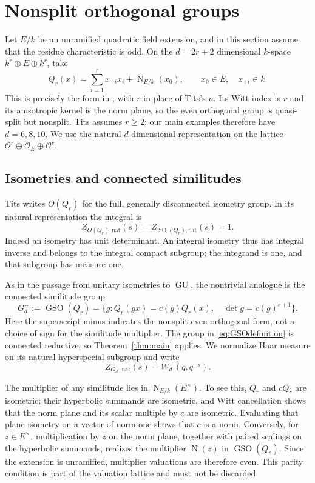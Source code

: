 \documentclass[11pt,a4paper]{article}
\theoremstyle{definition}
\newcommand{\OO}{\mathcal O}
\newcommand{\GU}{\operatorname{GU}}
\newcommand{\GSO}{\operatorname{GSO}}
\newcommand{\SO}{\operatorname{SO}}
\newcommand{\N}{\operatorname N}
\begin{document}
\section{Nonsplit orthogonal groups}
\label{sec:orthogonal}
Let $E/k$ be an unramified quadratic field extension, and in this
section assume that the residue characteristic is odd. On the
$d=2r+2$ dimensional $k$-space $k^r\oplus E\oplus k^r$, take
\begin{equation}\label{eq:orthogonalform}
 Q_r(x)=\sum_{i=1}^r x_{-i}x_i+\N_{E/k}(x_0),
 \qquad x_0\in E,\quad x_{\pm i}\in k.
\end{equation}
This is precisely the form in \cite[Example~1.16, pp.~42--43]{Tits},
with $r$ in place of Tits's $n$. Its Witt index is $r$ and its
anisotropic kernel is the norm plane, so the even orthogonal group
is quasi-split but nonsplit. Tits assumes $r\geq2$; our main
examples therefore have $d=6,8,10$. We use the natural
$d$-dimensional representation on the lattice
$\OO^r\oplus\OO_E\oplus\OO^r$.

\subsection{Isometries and connected similitudes}
Tits writes $O(Q_r)$ for the full, generally disconnected isometry
group. In its natural representation the integral is
\begin{equation}\label{eq:orthogonalisometry}
 Z_{O(Q_r),\mathrm{nat}}(s)=Z_{\SO(Q_r),\mathrm{nat}}(s)=1.
\end{equation}
Indeed an isometry has unit determinant. An integral isometry thus
has integral inverse and belongs to the integral compact subgroup;
the integrand is one, and that subgroup has measure one.

As in the passage from unitary isometries to $\GU$, the nontrivial
analogue is the connected similitude group
\begin{equation}\label{eq:GSOdefinition}
 G_d^-:=\GSO(Q_r)=
 \{g:Q_r(gx)=c(g)Q_r(x),\quad\det g=c(g)^{r+1}\}.
\end{equation}
Here the superscript minus indicates the nonsplit even orthogonal
form, not a choice of sign for the similitude multiplier. The group
in \eqref{eq:GSOdefinition} is connected reductive, so
Theorem~\ref{thm:main} applies. We normalize Haar measure on its
natural hyperspecial subgroup and write
\[
 Z_{G_d^-,\mathrm{nat}}(s)=W_d^-(q,q^{-s}).
\]

The multiplier of any similitude lies in $\N_{E/k}(E^\times)$.
To see this, $Q_r$ and $cQ_r$ are isometric; their hyperbolic
summands are isometric, and Witt cancellation shows that the norm
plane and its scalar multiple by $c$ are isometric. Evaluating that
plane isometry on a vector of norm one shows that $c$ is a norm.
Conversely, for $z\in E^\times$, multiplication by $z$ on the norm
plane, together with paired scalings on the hyperbolic summands,
realizes the multiplier $\N(z)$ in $\GSO(Q_r)$.
Since the extension is unramified, multiplier valuations are therefore
even. This parity condition is part of the valuation lattice and
must not be discarded.
\end{document}
